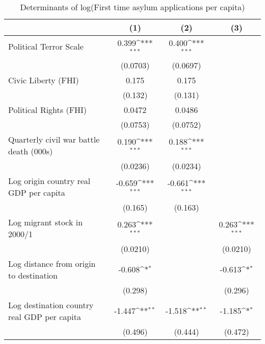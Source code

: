 \begin{table}[htbp]\centering
\def\sym#1{\ifmmode^{#1}\else\(^{#1}\)\fi}
\caption{Determinants of log(First time asylum applications per capita)}
\begin{tabular}{l*{3}{c}}
\hline\hline
                    &\multicolumn{1}{c}{(1)}         &\multicolumn{1}{c}{(2)}         &\multicolumn{1}{c}{(3)}         \\
\hline
Political Terror Scale&       0.399\sym{***}&       0.400\sym{***}&                     \\
                    &    (0.0703)         &    (0.0697)         &                     \\
[1em]
Civic Liberty (FHI) &       0.175         &       0.175         &                     \\
                    &     (0.132)         &     (0.131)         &                     \\
[1em]
Political Rights (FHI)&      0.0472         &      0.0486         &                     \\
                    &    (0.0753)         &    (0.0752)         &                     \\
[1em]
Quarterly civil war battle death (000s)&       0.190\sym{***}&       0.188\sym{***}&                     \\
                    &    (0.0236)         &    (0.0234)         &                     \\
[1em]
Log origin country real GDP per capita&      -0.659\sym{***}&      -0.661\sym{***}&                     \\
                    &     (0.165)         &     (0.163)         &                     \\
[1em]
Log migrant stock in 2000/1&       0.263\sym{***}&                     &       0.263\sym{***}\\
                    &    (0.0210)         &                     &    (0.0210)         \\
[1em]
Log distance from origin to destination&      -0.608\sym{*}  &                     &      -0.613\sym{*}  \\
                    &     (0.298)         &                     &     (0.296)         \\
[1em]
Log destination country real GDP per capita&      -1.447\sym{**} &      -1.518\sym{**} &      -1.185\sym{*}  \\
                    &     (0.496)         &     (0.444)         &     (0.472)         \\

\end{tabular}
\end{table}
